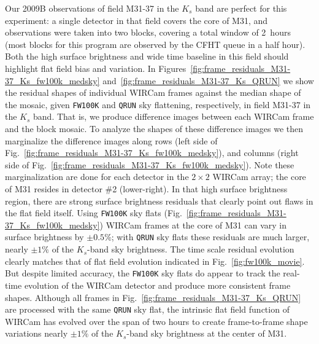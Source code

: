 \documentclass[iop]{emulateapj}
\newcommand{\Fig}[1]{Fig.~\ref{fig:#1}}  %
\begin{document}
Our 2009B observations of field M31-37 in the $K_s$ band are perfect for this experiment: a single detector in that field covers the core of M31, and observations were taken into two blocks, covering a total window of 2~hours (most blocks for this program are observed by the CFHT queue in a half hour).
Both the high surface brightness and wide time baseline in this field should highlight flat field bias and variation.
In Figures~\ref{fig:frame_residuals_M31-37_Ks_fw100k_medsky} and~\ref{fig:frame_residuals_M31-37_Ks_QRUN} we show the residual shapes of individual WIRCam frames against the median shape of the mosaic, given \texttt{FW100K} and \texttt{QRUN} sky flattening, respectively, in field M31-37 in the $K_s$ band.
That is, we produce difference images between each WIRCam frame and the block mosaic.
To analyze the shapes of these difference images we then marginalize the difference images along rows (left side of \Fig{frame_residuals_M31-37_Ks_fw100k_medsky}), and columns (right side of \Fig{frame_residuals_M31-37_Ks_fw100k_medsky}).
Note these marginalization are done for each detector in the $2\times2$ WIRCam array; the core of M31 resides in detector \#2 (lower-right).
In that high surface brightness region, there are strong surface brightness residuals that clearly point out flaws in the flat field itself.
Using \texttt{FW100K} sky flats (\Fig{frame_residuals_M31-37_Ks_fw100k_medsky}) WIRCam frames at the core of M31 can vary in surface brightness by $\pm 0.5\%$; with \texttt{QRUN} sky flats these residuals are much larger, nearly $\pm 1\%$ of the $K_s$-band sky brightness.
The time scale residual evolution clearly matches that of flat field evolution indicated in \Fig{fw100k_movie}.
But despite limited accuracy, the \texttt{FW100K} sky flats do appear to track the real-time evolution of the WIRCam detector and produce more consistent frame shapes.
Although all frames in \Fig{frame_residuals_M31-37_Ks_QRUN} are processed with the same \texttt{QRUN} sky flat, the intrinsic flat field function of WIRCam has evolved over the span of two hours to create frame-to-frame shape variations nearly $\pm 1\%$ of the $K_s$-band sky brightness at the center of M31.
\end{document}
